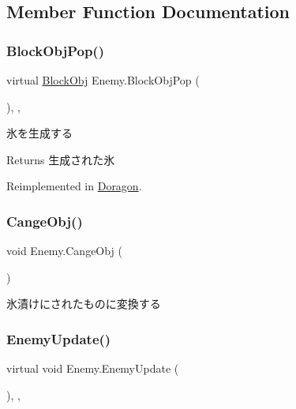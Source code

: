 \subsection{Member Function Documentation}
\mbox{\label{class_enemy_ab56d4c134b6fc007e07e6825b04f11a5}} 
\subsubsection{\texorpdfstring{Block\+Obj\+Pop()}{BlockObjPop()}}
{\footnotesize\ttfamily virtual \hyperlink{class_block_obj}{Block\+Obj} Enemy.\+Block\+Obj\+Pop (\begin{DoxyParamCaption}{ }\end{DoxyParamCaption})\hspace{0.3cm}{\ttfamily [inline]}, {\ttfamily [protected]}, {\ttfamily [virtual]}}



氷を生成する 

\begin{DoxyReturn}{Returns}
生成された氷
\end{DoxyReturn}


Reimplemented in \hyperlink{class_doragon_a981089224fd04b5d556eae0b9801112f}{Doragon}.

\mbox{\label{class_enemy_acd99666df643c0fea93610769b5bd214}} 
\subsubsection{\texorpdfstring{Cange\+Obj()}{CangeObj()}}
{\footnotesize\ttfamily void Enemy.\+Cange\+Obj (\begin{DoxyParamCaption}{ }\end{DoxyParamCaption})\hspace{0.3cm}{\ttfamily [inline]}}



氷漬けにされたものに変換する 

\mbox{\label{class_enemy_ab19a73003a5b443ba93f4b6a45c0abad}} 
\subsubsection{\texorpdfstring{Enemy\+Update()}{EnemyUpdate()}}
{\footnotesize\ttfamily virtual void Enemy.\+Enemy\+Update (\begin{DoxyParamCaption}{ }\end{DoxyParamCaption})\hspace{0.3cm}{\ttfamily [inline]}, {\ttfamily [protected]}, {\ttfamily [virtual]}}



